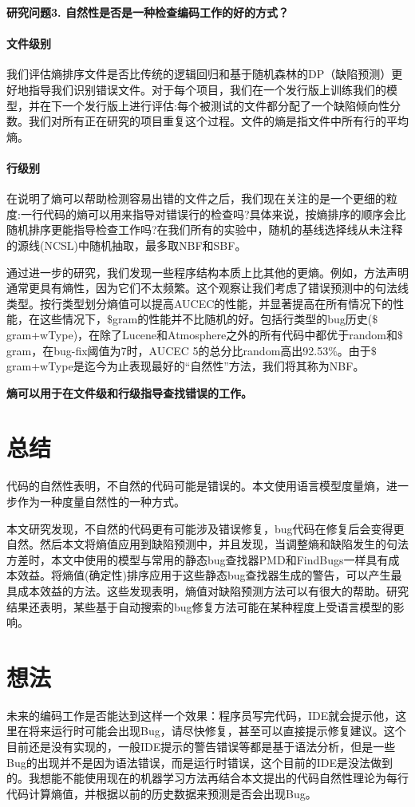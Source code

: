 \documentclass[a4paper]{article}
\begin{document}
\textbf{研究问题3. 自然性是否是一种检查编码工作的好的方式？}
\paragraph{文件级别}我们评估熵排序文件是否比传统的逻辑回归和基于随机森林的DP（缺陷预测）更好地指导我们识别错误文件。对于每个项目，我们在一个发行版上训练我们的模型，并在下一个发行版上进行评估:每个被测试的文件都分配了一个缺陷倾向性分数。我们对所有正在研究的项目重复这个过程。文件的熵是指文件中所有行的平均熵。

\paragraph{行级别}在说明了熵可以帮助检测容易出错的文件之后，我们现在关注的是一个更细的粒度:一行代码的熵可以用来指导对错误行的检查吗?具体来说，按熵排序的顺序会比随机排序更能指导检查工作吗?在我们所有的实验中，随机的基线选择线从未注释的源线(NCSL)中随机抽取，最多取NBF和SBF。

通过进一步的研究，我们发现一些程序结构本质上比其他的更熵。例如，方法声明通常更具有熵性，因为它们不太频繁。这个观察让我们考虑了错误预测中的句法线类型。按行类型划分熵值可以提高AUCEC的性能，并显著提高在所有情况下的性能，在这些情况下，$\$$gram的性能并不比随机的好。包括行类型的bug历史($\$$gram+wType)，在除了Lucene和Atmosphere之外的所有代码中都优于random和$\$$gram，在bug-fix阈值为7时，AUCEC 5的总分比random高出92.53$\%$。由于$\$$gram+wType是迄今为止表现最好的“自然性”方法，我们将其称为NBF。

\textbf{熵可以用于在文件级和行级指导查找错误的工作。}

\section{总结}
代码的自然性表明，不自然的代码可能是错误的。本文使用语言模型度量熵，进一步作为一种度量自然性的一种方式。

本文研究发现，不自然的代码更有可能涉及错误修复，bug代码在修复后会变得更自然。然后本文将熵值应用到缺陷预测中，并且发现，当调整熵和缺陷发生的句法方差时，本文中使用的模型与常用的静态bug查找器PMD和FindBugs一样具有成本效益。将熵值(确定性)排序应用于这些静态bug查找器生成的警告，可以产生最具成本效益的方法。这些发现表明，熵值对缺陷预测方法可以有很大的帮助。研究结果还表明，某些基于自动搜索的bug修复方法可能在某种程度上受语言模型的影响。

\section{想法}
未来的编码工作是否能达到这样一个效果：程序员写完代码，IDE就会提示他，这里在将来运行时可能会出现Bug，请尽快修复，甚至可以直接提示修复建议。这个目前还是没有实现的，一般IDE提示的警告错误等都是基于语法分析，但是一些Bug的出现并不是因为语法错误，而是运行时错误，这个目前的IDE是没法做到的。我想能不能使用现在的机器学习方法再结合本文提出的代码自然性理论为每行代码计算熵值，并根据以前的历史数据来预测是否会出现Bug。

\newpage


\end{document}
